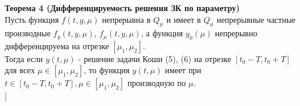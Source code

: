 \textbf{Теорема 4 (Дифференцируемость решения ЗК по параметру)}\\
Пусть функция $f(t,y,\mu)$ непрерывна в $Q_\mu$ и имеет в $Q_\mu$ непрерывные частные производные $f_y(t,y,\mu)$, $f_\mu(t,y,\mu)$, а функция $y_0(\mu)$ непрерывно дифференцируема на отрезке $[\mu_1,\mu_2]$.\\
Тогда если $y(t,\mu)$ - решение задачи Коши (5), (6) на отрезке $[t_0-T,t_0+T]$ для всех $\mu \in [\mu_1,\mu_2]$, то функция $y(t,\mu)$ имеет при $t\in [t_0-T,t_0+T], \mu \in [\mu_1,\mu_2]$ производную по $\mu$.\\


\bigbreak
[\cite[6-13]{denisov2}]
